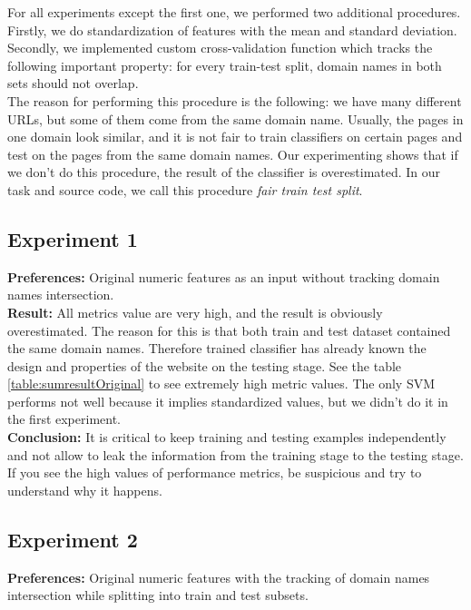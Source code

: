For all experiments except the first one, we performed two additional procedures. Firstly, we do standardization of features with the mean and standard deviation. Secondly, we implemented custom cross-validation function which tracks the following important property: for every train-test split, domain names in both sets should not overlap. \\

The reason for performing this procedure is the following: we have many different URLs, but some of them come from the same domain name. Usually, the pages in one domain look similar, and it is not fair to train classifiers on certain pages and test on the pages from the same domain names. Our experimenting shows that if we don't do this procedure, the result of the classifier is overestimated. In our task and source code, we call this procedure \textit{fair train test split}.\\

\subsection{Experiment 1}
\noindent\textbf{Preferences:} Original numeric features as an input without tracking domain names intersection. \\

\noindent\textbf{Result:} All metrics value are very high, and the result is obviously overestimated. The reason for this is that both train and test dataset contained the same domain names. Therefore trained classifier has already known the design and properties of the website on the testing stage. See the table \ref{table:sumresultOriginal} to see extremely high metric values. The only SVM performs not well because it implies standardized values, but we didn't do it in the first experiment.\\

\noindent\textbf{Conclusion:} It is critical to keep training and testing examples independently and not allow to leak the information from the training stage to the testing stage. If you see the high values of performance metrics, be suspicious and try to understand why it happens.

\subsection{Experiment 2}
\noindent\textbf{Preferences:} Original numeric features with the tracking of domain names intersection while splitting into train and test subsets. \\

